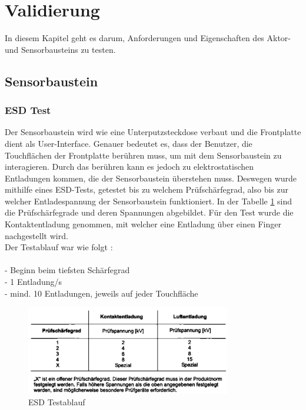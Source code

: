 \section{Validierung}
In diesem Kapitel geht es darum, Anforderungen und Eigenschaften des Aktor- und Sensorbausteins zu testen.
\subsection{Sensorbaustein}
\subsubsection{ESD Test}
Der Sensorbaustein wird wie eine Unterputzsteckdose verbaut und die Frontplatte dient als User-Interface. 
Genauer bedeutet es, dass der Benutzer, die Touchflächen der Frontplatte berühren muss, um mit dem Sensorbaustein zu interagieren. 
Durch das berühren kann es jedoch zu elektrostatischen Entladungen kommen, die der Sensorbaustein überstehen muss.
Deswegen wurde mithilfe eines ESD-Tests, getestet bis zu welchem Prüfschärfegrad, also bis zur welcher Entladespannung der Sensorbaustein funktioniert.
In der Tabelle \ref{tab: ESD_Testablauf} sind die Prüfschärfegrade und deren Spannungen abgebildet.
Für den Test wurde die Kontaktentladung genommen, mit welcher eine Entladung über einen Finger nachgestellt wird.\\
Der Testablauf war wie folgt \cite{schleuniger_emv_w8_2020}:\\
\\
- Beginn beim tiefsten Schärfegrad\\
- 1 Entladung/s\\
- mind. 10 Entladungen, jeweils auf jeder Touchfläche\\


\begin{figure}[H]
	\centering
	\includegraphics[width=0.8\textwidth]{graphics/ESD_Testablauf.jpg}
	\caption{ESD Testablauf \cite{schleuniger_emv_w8_2020}}
	\label{tab: ESD_Testablauf}
\end{figure}

